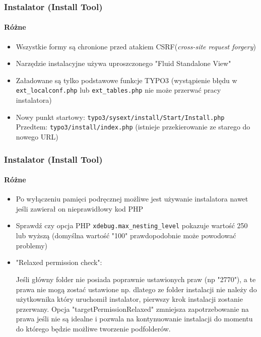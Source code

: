 
\begin{frame}[fragile]
	\frametitle{Instalator (Install Tool)}
	\framesubtitle{Różne}

	\begin{itemize}
		\item Wszystkie formy są chronione przed atakiem CSRF(\textit{cross-site request forgery})
		\item Narzędzie instalacyjne używa uproszczonego "Fluid Standalone View"
		\item Załadowane są tylko podstawowe funkcje TYPO3\newline
			(wystąpienie błędu w \texttt{ ext\_localconf.php} lub \texttt{ext\_tables.php} nie może przerwać pracy instalatora)
		\item Nowy punkt startowy:	\tabto{3.2cm} \texttt{typo3/sysext/install/Start/Install.php}\newline
			Przedtem:				\tabto{3.2cm} \texttt{typo3/install/index.php}\newline
									\tabto{3.2cm} (istnieje przekierowanie ze starego do nowego\newline
									\tabto{3.2cm} URL)
	\end{itemize}

\end{frame}


\begin{frame}[fragile]
	\frametitle{Instalator (Install Tool)}
	\framesubtitle{Różne}

	\begin{itemize}
		\item Po wyłączeniu pamięci podręcznej możliwe jest używanie instalatora nawet jeśli zawierał on nieprawidłowy kod PHP
		\item Sprawdź czy opcja PHP \texttt{xdebug.max\_nesting\_level} pokazuje wartość 250 lub wyższą (domyślna wartość "100" prawdopodobnie może powodować problemy)
		\item "Relaxed permission check":

			\small
				Jeśli główny folder nie posiada poprawnie ustawionych praw (np "2770"), 
				a te prawa nie mogą zostać ustawione np. dlatego ze folder instalacji nie 
				należy do użytkownika który uruchomił instalator, pierwszy krok instalacji
				zostanie przerwany.
				Opcja "targetPermissionRelaxed" zmniejsza zapotrzebowanie na prawa jeśli nie są 
				idealne i pozwala na kontynuowanie instalacji do momentu do którego będzie możliwe
				tworzenie podfolderów.
			\normalsize

	\end{itemize}

\end{frame}

